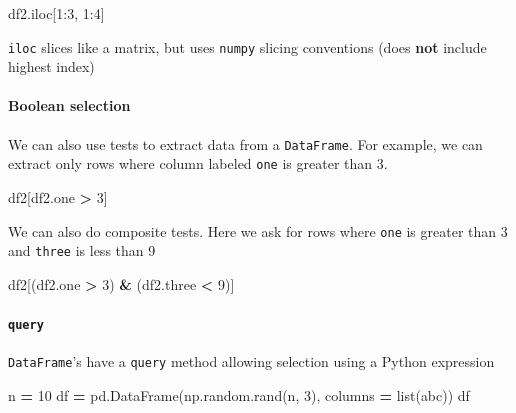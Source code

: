 \documentclass[
  letterpaper,
]{scrbook}
\newenvironment{Shaded}{\begin{snugshade}}{\end{snugshade}}
\newcommand{\BuiltInTok}[1]{#1}
\newcommand{\DecValTok}[1]{\textcolor[rgb]{0.00,0.00,0.81}{#1}}
\newcommand{\NormalTok}[1]{#1}
\newcommand{\OperatorTok}[1]{\textcolor[rgb]{0.81,0.36,0.00}{\textbf{#1}}}
\newcommand{\StringTok}[1]{\textcolor[rgb]{0.31,0.60,0.02}{#1}}
\begin{document}
\begin{Shaded}
\begin{Highlighting}[]
\NormalTok{df2.iloc[}\DecValTok{1}\NormalTok{:}\DecValTok{3}\NormalTok{, }\DecValTok{1}\NormalTok{:}\DecValTok{4}\NormalTok{]}
\end{Highlighting}
\end{Shaded}

\texttt{iloc} slices like a matrix, but uses \texttt{numpy} slicing conventions (does \textbf{not} include highest index)

\hypertarget{boolean-selection}{%
\paragraph{Boolean selection}\label{boolean-selection}}

We can also use tests to extract data from a \texttt{DataFrame}. For example, we can extract only rows where column labeled \texttt{one} is greater than 3.

\begin{Shaded}
\begin{Highlighting}[]
\NormalTok{df2[df2.one }\OperatorTok{\textgreater{}} \DecValTok{3}\NormalTok{]}
\end{Highlighting}
\end{Shaded}

We can also do composite tests. Here we ask for rows where \texttt{one} is greater than 3 and \texttt{three} is less than 9

\begin{Shaded}
\begin{Highlighting}[]
\NormalTok{df2[(df2.one }\OperatorTok{\textgreater{}} \DecValTok{3}\NormalTok{) }\OperatorTok{\&}\NormalTok{ (df2.three }\OperatorTok{\textless{}} \DecValTok{9}\NormalTok{)]}
\end{Highlighting}
\end{Shaded}

\hypertarget{query}{%
\paragraph{\texorpdfstring{\texttt{query}}{query}}\label{query}}

\texttt{DataFrame}'s have a \texttt{query} method allowing selection using a Python expression

\begin{Shaded}
\begin{Highlighting}[]
\NormalTok{n }\OperatorTok{=} \DecValTok{10}
\NormalTok{df }\OperatorTok{=}\NormalTok{ pd.DataFrame(np.random.rand(n, }\DecValTok{3}\NormalTok{), columns }\OperatorTok{=} \BuiltInTok{list}\NormalTok{(}\StringTok{\textquotesingle{}abc\textquotesingle{}}\NormalTok{))}
\NormalTok{df}
\end{Highlighting}
\end{Shaded}
\end{document}
